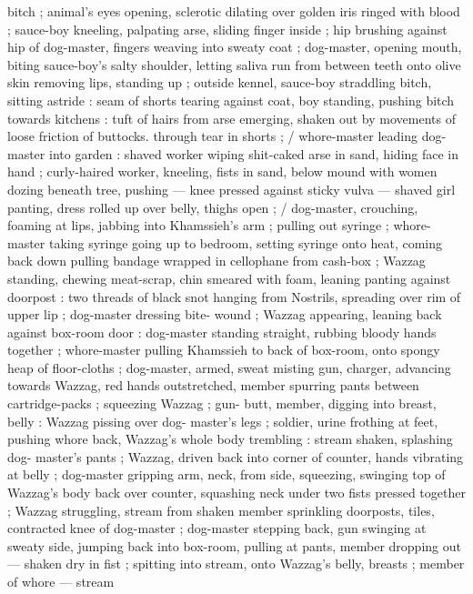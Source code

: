 bitch ; animal's eyes opening, sclerotic dilating over golden iris 
ringed with blood ; sauce-boy kneeling, palpating arse, sliding finger 
inside ; hip brushing against hip of dog-master, fingers weaving into 
sweaty coat ; dog-master, opening mouth, biting sauce-boy's salty 
shoulder, letting saliva run from between teeth onto olive skin 
removing lips, standing up ; outside kennel, sauce-boy straddling 
bitch, sitting astride : seam of shorts tearing against coat, boy 
standing, pushing bitch towards kitchens : tuft of hairs from arse 
emerging, shaken out by movements of loose friction of buttocks. 
through tear in shorts ; {\slash} whore-master leading dog-master into 
garden : shaved worker wiping shit-caked arse in sand, hiding face 
in hand ; curly-haired worker, kneeling, fists in sand, below mound 
with women dozing beneath tree, pushing --- knee pressed against 
sticky vulva --- shaved girl panting, dress rolled up over belly, thighs 
open ; {\slash} dog-master, crouching, foaming at lips, jabbing into 
Khamssieh's arm ; pulling out syringe ; whore-master taking syringe 
going up to bedroom, setting syringe onto heat, coming back down 
pulling bandage wrapped in cellophane from cash-box ; Wazzag 
standing, chewing meat-scrap, chin smeared with foam, leaning 
panting against doorpost : two threads of black snot hanging from 
Nostrils, spreading over rim of upper lip ; dog-master dressing bite- 
wound ; Wazzag appearing, leaning back against box-room door : 
dog-master standing straight, rubbing bloody hands together ; 
whore-master pulling Khamssieh to back of box-room, onto spongy 
heap of floor-cloths ; dog-master, armed, sweat misting gun, charger, 
advancing towards Wazzag, red hands outstretched, member 
spurring pants between cartridge-packs ; squeezing Wazzag ; gun- 
butt, member, digging into breast, belly : Wazzag pissing over dog- 
master's legs ; soldier, urine frothing at feet, pushing whore back, 
Wazzag's whole body trembling : stream shaken, splashing dog- 
master's pants ; Wazzag, driven back into corner of counter, hands 
vibrating at belly ; dog-master gripping arm, neck, from side, 
squeezing, swinging top of Wazzag's body back over counter, 
squashing neck under two fists pressed together ; Wazzag 
struggling, stream from shaken member sprinkling doorposts, tiles, 
contracted knee of dog-master ; dog-master stepping back, gun 
swinging at sweaty side, jumping back into box-room, pulling at 
pants, member dropping out --- shaken dry in fist ; spitting into 
stream, onto Wazzag's belly, breasts ; member of whore --- stream 
